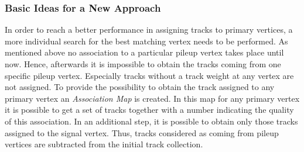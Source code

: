 \subsubsection{Basic Ideas for a New Approach}

In order to reach a better performance in assigning tracks to primary vertices, a more individual search for the best matching vertex needs to be performed. As mentioned above no association to a particular pileup vertex takes place until now. Hence, afterwards it is impossible to obtain the tracks coming from one specific pileup vertex. Especially tracks without a track weight at any vertex are not assigned. To provide the possibility to obtain the track assigned to any primary vertex an \textit{Association Map} is created. In this map for any primary vertex it is possible to get a set of tracks together with a number indicating the quality of this association. In an additional step, it is possible to obtain only those tracks assigned to the signal vertex. Thus, tracks considered as coming from pileup vertices are subtracted from the initial track collection.

